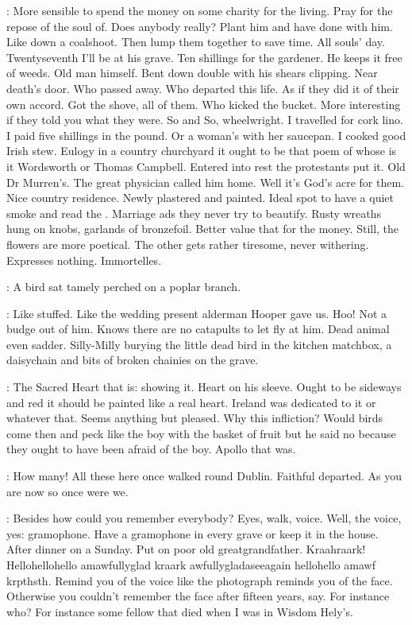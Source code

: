\BloomInt:
More sensible to spend the money on some charity for the living.
Pray for the repose of the soul of.
Does anybody really?
Plant him and have done with him.
Like down a coalshoot.
Then lump them together to save time.
All souls' day.
Twentyseventh I'll be at his grave.
Ten shillings for the gardener.
He keeps it free of weeds.
Old man himself.
Bent down double with his shears clipping.
Near death's door.
Who passed away.
Who departed this life.
As if they did it of their own accord.
Got the shove, all of them.
Who kicked the bucket.
More interesting if they told you what they were.
So and So, wheelwright.
I travelled for cork lino.
I paid five shillings in the pound.
Or a woman's with her saucepan.
I cooked good Irish stew.
Eulogy in a country churchyard it ought to be
that poem of whose is it Wordsworth or Thomas Campbell.
Entered into rest the protestants put it.
Old Dr Murren's.
The great physician called him home.
Well it's God's acre for them.
Nice country residence.
Newly plastered and painted.
Ideal spot to have a quiet smoke and read the .
Marriage ads they never try to beautify.
Rusty wreaths hung on knobs, garlands of bronzefoil.
Better value that for the money.
Still, the flowers are more poetical.
The other gets rather tiresome, never withering.
Expresses nothing.
Immortelles.

:
A bird sat tamely perched on a poplar branch.

\BloomInt:
Like stuffed.
Like the wedding present alderman Hooper gave us.
Hoo!
Not a budge out of him.
Knows there are no catapults to let fly at him.
Dead animal even sadder.
Silly-Milly burying the little dead bird in the kitchen matchbox,
a daisychain and bits of broken chainies on the grave.

\BloomInt:
The Sacred Heart that is:
showing it.
Heart on his sleeve.
Ought to be sideways and red
it should be painted like a real heart.
Ireland was dedicated to it or whatever that.
Seems anything but pleased.
Why this infliction?
Would birds come then and peck
like the boy with the basket of fruit
but he said no
because they ought to have been afraid of the boy.
Apollo that was.

\BloomInt:
How many!
All these here once walked round Dublin.
Faithful departed.
As you are now so once were we.

\BloomInt:
Besides how could you remember everybody?
Eyes, walk, voice.
Well, the voice, yes:
gramophone.
Have a gramophone in every grave or keep it in the house.
After dinner on a Sunday.
Put on poor old greatgrandfather.
Kraahraark!
Hellohellohello amawfullyglad kraark awfullygladaseeagain hellohello amawf krpthsth.
Remind you of the voice
like the photograph reminds you of the face.
Otherwise you couldn't remember the face after fifteen years, say.
For instance who?
For instance some fellow that died
when I was in Wisdom Hely's.

